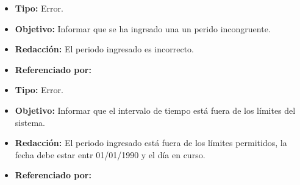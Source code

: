   \begin{itemize}
    \item \textbf{Tipo:} Error. 
    \item \textbf{Objetivo:}  Informar que se ha ingrsado una un perido incongruente.
    \item \textbf{Redacción:} El periodo ingresado es incorrecto.
    \item \textbf{Referenciado por:} \\
  \end{itemize}

  \begin{itemize}
    \item \textbf{Tipo:} Error. 
    \item \textbf{Objetivo:}  Informar que el intervalo de tiempo está fuera de los límites del sistema.
    \item \textbf{Redacción:} El periodo ingresado está fuera de los límites permitidos, la fecha debe estar entr 01/01/1990 y el día en curso.
    \item \textbf{Referenciado por:} \\
  \end{itemize}